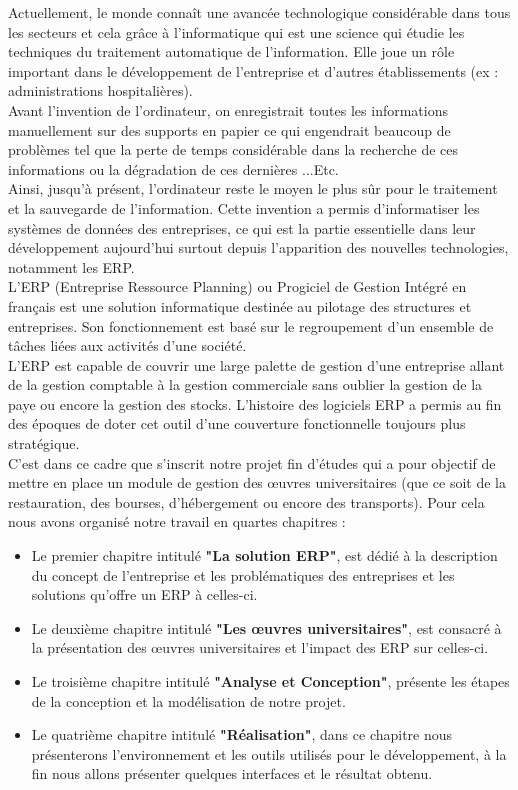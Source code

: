 Actuellement, le monde connaît une avancée technologique considérable dans tous les secteurs et cela grâce à l'informatique qui est une science qui étudie les techniques du traitement automatique de l'information. Elle joue un rôle important dans le développement de l'entreprise et d'autres établissements (ex : administrations hospitalières).\\

Avant l'invention de l'ordinateur, on enregistrait toutes les informations manuellement sur des supports en papier ce qui engendrait beaucoup de problèmes tel que la perte de temps considérable dans la recherche de ces informations ou la dégradation de ces dernières ...Etc.\\

Ainsi, jusqu'à présent, l'ordinateur reste le moyen le plus sûr pour le traitement et la sauvegarde de l'information. Cette invention a permis d'informatiser les systèmes de données des entreprises, ce qui est la partie essentielle dans leur développement aujourd'hui surtout depuis l'apparition des nouvelles technologies, notamment les ERP.\\

L'ERP (Entreprise Ressource Planning) ou Progiciel de Gestion Intégré en français est une solution informatique destinée au pilotage des structures et entreprises. Son fonctionnement est basé sur le regroupement d'un ensemble de tâches liées aux activités d'une société.\\

L'ERP est capable de couvrir une large palette de gestion d'une entreprise allant de la gestion comptable à la gestion commerciale sans oublier la gestion de la paye ou encore la gestion des stocks. L'histoire des logiciels ERP a permis au fin des époques de doter cet outil d'une couverture fonctionnelle toujours plus stratégique.\\

C'est dans ce cadre que s'inscrit notre projet fin d'études qui a pour objectif de mettre en place un module de gestion des œuvres universitaires (que ce soit de la restauration, des bourses, d'hébergement ou encore des transports). Pour cela nous avons organisé notre travail en quartes chapitres :\\

\begin{itemize}
    \item Le premier chapitre intitulé \textbf{"La solution ERP"}, est dédié à la description du concept de l'entreprise et les problématiques des entreprises et les solutions qu'offre un ERP à celles-ci.
    \item Le deuxième chapitre intitulé \textbf{"Les œuvres universitaires"}, est consacré à la présentation des œuvres universitaires et l'impact des ERP sur celles-ci.
    \item Le troisième chapitre intitulé \textbf{"Analyse et Conception"}, présente les étapes de la conception et la modélisation de notre projet.
    \item Le quatrième chapitre intitulé \textbf{"Réalisation"}, dans ce chapitre nous présenterons l'environnement et les outils utilisés pour le développement, à la fin nous allons présenter quelques interfaces et le résultat obtenu.
\end{itemize}